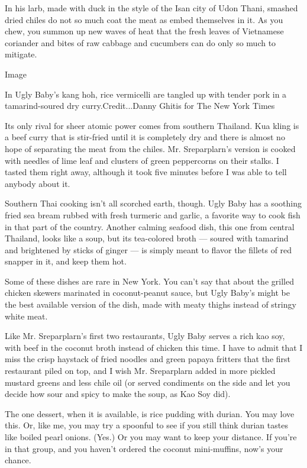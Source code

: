 In his larb, made with duck in the style of the Isan city of Udon Thani,
smashed dried chiles do not so much coat the meat as embed themselves in
it. As you chew, you summon up new waves of heat that the fresh leaves
of Vietnamese coriander and bites of raw cabbage and cucumbers can do
only so much to mitigate.

Image

In Ugly Baby's kang hoh, rice vermicelli are tangled up with tender pork
in a tamarind-soured dry curry.Credit...Danny Ghitis for The New York
Times

Its only rival for sheer atomic power comes from southern Thailand. Kua
kling is a beef curry that is stir-fried until it is completely dry and
there is almost no hope of separating the meat from the chiles. Mr.
Sreparplarn's version is cooked with needles of lime leaf and clusters
of green peppercorns on their stalks. I tasted them right away, although
it took five minutes before I was able to tell anybody about it.

Southern Thai cooking isn't all scorched earth, though. Ugly Baby has a
soothing fried sea bream rubbed with fresh turmeric and garlic, a
favorite way to cook fish in that part of the country. Another calming
seafood dish, this one from central Thailand, looks like a soup, but its
tea-colored broth --- soured with tamarind and brightened by sticks of
ginger --- is simply meant to flavor the fillets of red snapper in it,
and keep them hot.

Some of these dishes are rare in New York. You can't say that about the
grilled chicken skewers marinated in coconut-peanut sauce, but Ugly
Baby's might be the best available version of the dish, made with meaty
thighs instead of stringy white meat.

Like Mr. Sreparplarn's first two restaurants, Ugly Baby serves a rich
kao soy, with beef in the coconut broth instead of chicken this time. I
have to admit that I miss the crisp haystack of fried noodles and green
papaya fritters that the first restaurant piled on top, and I wish Mr.
Sreparplarn added in more pickled mustard greens and less chile oil (or
served condiments on the side and let you decide how sour and spicy to
make the soup, as Kao Soy did).

The one dessert, when it is available, is rice pudding with durian. You
may love this. Or, like me, you may try a spoonful to see if you still
think durian tastes like boiled pearl onions. (Yes.) Or you may want to
keep your distance. If you're in that group, and you haven't ordered the
coconut mini-muffins, now's your chance.

